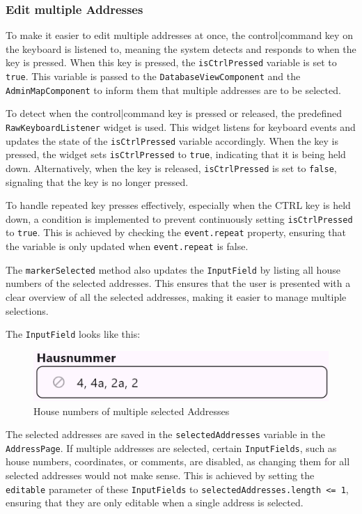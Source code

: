 \subsubsection{Edit multiple Addresses}
\label{fig:Edit multiple addresses}
To make it easier to edit multiple addresses at once, the control|command key on the keyboard is listened to, meaning the system detects and responds to when the key is pressed. When this key is pressed, the \texttt{isCtrlPressed} variable is set to \texttt{true}. This variable is passed to the \texttt{DatabaseViewComponent} and the \texttt{AdminMapComponent} to inform them that multiple addresses are to be selected.\blankLine


To detect when the control|command key is pressed or released, the predefined \texttt{RawKeyboardListener} widget is used. This widget listens for keyboard events and updates the state of the \texttt{isCtrlPressed} variable accordingly. When the key is pressed, the widget sets \texttt{isCtrlPressed} to \texttt{true}, indicating that it is being held down. Alternatively, when the  key is released, \texttt{isCtrlPressed} is set to \texttt{false}, signaling that the key is no longer pressed.

To handle repeated key presses effectively, especially when the CTRL key is held down, a condition is implemented to prevent continuously setting \texttt{isCtrlPressed} to \texttt{true}. This is achieved by checking the \texttt{event.repeat} property, ensuring that the variable is only updated when \texttt{event.repeat} is false.


The \texttt{markerSelected} method also updates the \texttt{InputField} by listing all house numbers of the selected addresses. This ensures that the user is presented with a clear overview of all the selected addresses, making it easier to manage multiple selections.

The \texttt{InputField} looks like this:
\begin{figure}[H]
    \centering
    \includegraphics[width=0.6\linewidth]{images/AdminPanel/listedHouseNumbersInputField.png}
    \caption{House numbers of multiple selected Addresses}
\end{figure}

The selected addresses are saved in the \texttt{selectedAddresses} variable in the \texttt{AddressPage}. If multiple addresses are selected, certain \texttt{InputFields}, such as house numbers, coordinates, or comments, are disabled, as changing them for all selected addresses would not make sense. This is achieved by setting the \texttt{editable} parameter of these \texttt{InputFields} to \texttt{selectedAddresses.length <= 1}, ensuring that they are only editable when a single address is selected.


